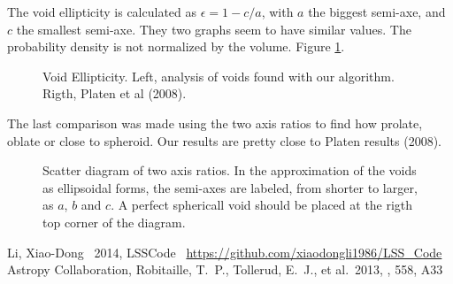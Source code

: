 \documentclass[preprint]{aastex62}
\begin{document}
The void ellipticity is calculated as $\epsilon = 1 - c/a$, with $a$ the biggest semi-axe, and
$c$ the smallest semi-axe. They two graphs seem to have similar values. The probability density
is not normalized by the volume. Figure \ref{fig:ellipticity}.

\begin{figure}
  \caption{Void Ellipticity. Left, analysis of voids found with our algorithm.
    Rigth, Platen et al (2008).
    \label{fig:ellipticity}}
\end{figure}

The last comparison was made using the two axis ratios to find how prolate, oblate or close
to spheroid. Our results are pretty close to Platen results (2008).

\begin{figure}
  \caption{Scatter diagram of two axis ratios. In the approximation of the voids
    as ellipsoidal forms, the semi-axes are labeled, from shorter to larger, as
    $a$, $b$ and $c$. A perfect sphericall void should be placed at the rigth top
    corner of the diagram. 
    \label{fig:two_axis_ratios}}
\end{figure}





\begin{thebibliography}{}

 Li, Xiao-Dong \ 2014, LSSCode \ \url{https://github.com/xiaodongli1986/LSS_Code}
 Astropy Collaboration, Robitaille, T.~P., Tollerud, E.~J., et al.\ 2013, \aap, 558, A33 

\end{thebibliography}
\end{document}
